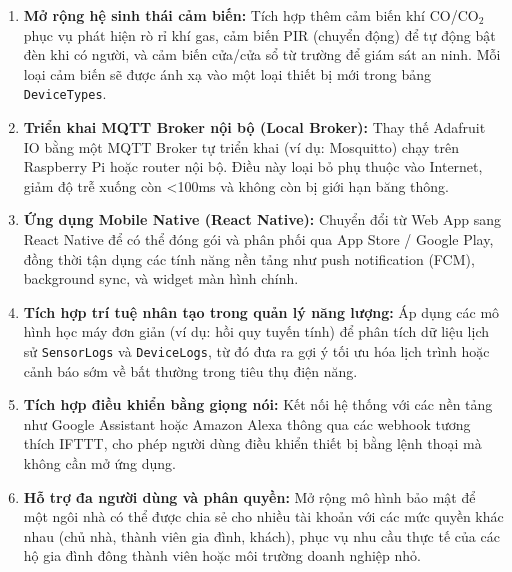 \begin{enumerate}
    \item \textbf{Mở rộng hệ sinh thái cảm biến:} Tích hợp thêm cảm biến khí CO/CO$_2$ phục vụ phát hiện rò rỉ khí gas, cảm biến PIR (chuyển động) để tự động bật đèn khi có người, và cảm biến cửa/cửa sổ từ trường để giám sát an ninh. Mỗi loại cảm biến sẽ được ánh xạ vào một loại thiết bị mới trong bảng \texttt{DeviceTypes}.

    \item \textbf{Triển khai MQTT Broker nội bộ (Local Broker):} Thay thế Adafruit IO bằng một MQTT Broker tự triển khai (ví dụ: Mosquitto) chạy trên Raspberry Pi hoặc router nội bộ. Điều này loại bỏ phụ thuộc vào Internet, giảm độ trễ xuống còn \textless{}100ms và không còn bị giới hạn băng thông.

    \item \textbf{Ứng dụng Mobile Native (React Native):} Chuyển đổi từ Web App sang React Native để có thể đóng gói và phân phối qua App Store / Google Play, đồng thời tận dụng các tính năng nền tảng như push notification (FCM), background sync, và widget màn hình chính.

    \item \textbf{Tích hợp trí tuệ nhân tạo trong quản lý năng lượng:} Áp dụng các mô hình học máy đơn giản (ví dụ: hồi quy tuyến tính) để phân tích dữ liệu lịch sử \texttt{SensorLogs} và \texttt{DeviceLogs}, từ đó đưa ra gợi ý tối ưu hóa lịch trình hoặc cảnh báo sớm về bất thường trong tiêu thụ điện năng.

    \item \textbf{Tích hợp điều khiển bằng giọng nói:} Kết nối hệ thống với các nền tảng như Google Assistant hoặc Amazon Alexa thông qua các webhook tương thích IFTTT, cho phép người dùng điều khiển thiết bị bằng lệnh thoại mà không cần mở ứng dụng.

    \item \textbf{Hỗ trợ đa người dùng và phân quyền:} Mở rộng mô hình bảo mật để một ngôi nhà có thể được chia sẻ cho nhiều tài khoản với các mức quyền khác nhau (chủ nhà, thành viên gia đình, khách), phục vụ nhu cầu thực tế của các hộ gia đình đông thành viên hoặc môi trường doanh nghiệp nhỏ.
\end{enumerate}
